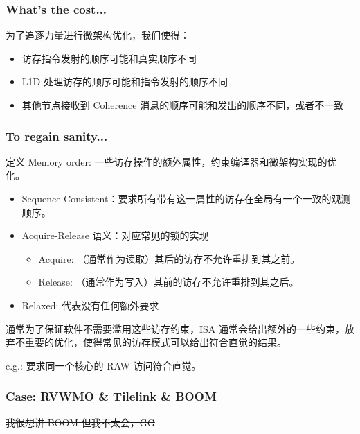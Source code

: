 \documentclass[UTF-8]{ctexbeamer}
\begin{document}
\begin{frame}
  \frametitle{What's the cost...}
  为了\sout{追逐力量}进行微架构优化，我们使得：

  \begin{itemize}
    \item 访存指令发射的顺序可能和真实顺序不同
    \item L1D 处理访存的顺序可能和指令发射的顺序不同
    \item 其他节点接收到 Coherence 消息的顺序可能和发出的顺序不同，或者不一致
  \end{itemize}
\end{frame}

\begin{frame}
  \frametitle{To regain sanity...}
  定义 Memory order: 一些访存操作的额外属性，约束编译器和微架构实现的优化。

  \pause
  \vspace{1em}

  \begin{itemize}
    \item Sequence Consistent：要求所有带有这一属性的访存在全局有一个一致的观测顺序。
    \item Acquire-Release 语义：对应常见的锁的实现
    \begin{itemize}
      \item Acquire: （通常作为读取）其后的访存不允许重排到其之前。
      \item Release: （通常作为写入）其前的访存不允许重排到其之后。
    \end{itemize}
    \item Relaxed: 代表没有任何额外要求
  \end{itemize}

  \pause
  \vspace{1em}

  通常为了保证软件不需要滥用这些访存约束，ISA 通常会给出额外的一些约束，放弃不重要的优化，使得常见的访存模式可以给出符合直觉的结果。

  \pause
  e.g.: 要求同一个核心的 RAW 访问符合直觉。
\end{frame}

\begin{frame}
  \frametitle{Case: RVWMO \& Tilelink \& BOOM}
  \pause
  \sout{我很想讲 BOOM 但我不太会，GG}
\end{frame}
\end{document}
